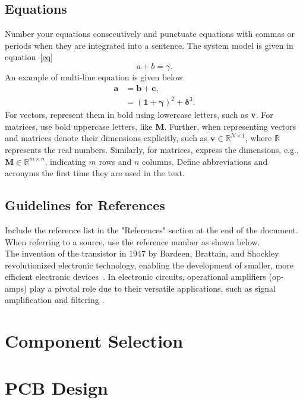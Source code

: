 \documentclass{article}
\begin{document}
\subsection{Equations}
Number your equations consecutively and punctuate equations with commas or periods when they are integrated into a sentence. The system model is given in equation~\eqref{eq}
\begin{equation}
	a + b = \gamma \label{eq}.
\end{equation}
An example of multi-line equation is given below 
\begin{equation}
\begin{aligned}
	\bm{a} &= \bm{b} + \bm{c}, \\
	&= \left(\bm{1}+\bm{\gamma}\right)^2 + \bm{\delta}^3.
\end{aligned}
\label{eq1} 
\end{equation}
For vectors, represent them in bold using lowercase letters, such as \textbf{v}. For matrices, use bold uppercase letters, like \textbf{M}. Further, when representing vectors and matrices denote their dimensions explicitly, such as $\mathbf{v} \in \mathbb{R}^{N \times 1}$, where $\mathbb{R}$ represents the real numbers. Similarly, for matrices, express the dimensions, e.g., $\mathbf{M} \in \mathbb{R}^{m \times n}$, indicating $m$ rows and $n$ columns. Define abbreviations and acronyms the first time they are used in the text.
\subsection{Guidelines for References}
Include the reference list in the "References" section at the end of the document.  When referring to a source, use the reference number as shown below.\\
The invention of the transistor in 1947 by Bardeen, Brattain, and Shockley revolutionized electronic technology, enabling the development of smaller, more efficient electronic devices~\cite{bardeen1948transistor}. In electronic circuits, operational amplifiers (op-amps) play a pivotal role due to their versatile applications, such as signal amplification and filtering \cite{sedra_smith_microelectronic_circuits}.
	
	

	\section{Component Selection}
	
	
	\section{PCB Design}
	
\end{document}
